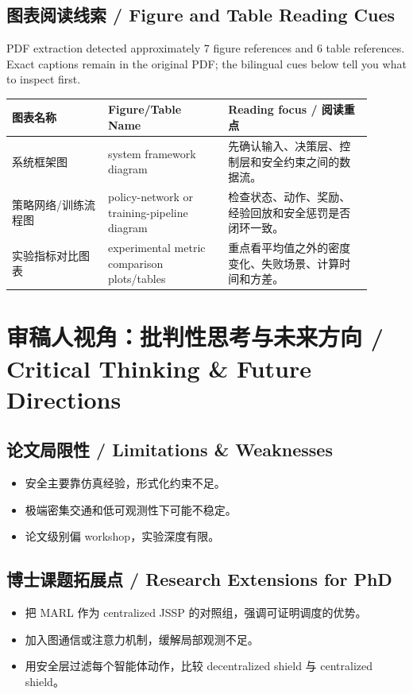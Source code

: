 \documentclass[UTF8,a4paper,11pt,fontset=fandol]{ctexart}
\begin{document}
\subsection{图表阅读线索 / Figure and Table Reading Cues}
PDF extraction detected approximately 7 figure references and 6 table references. Exact captions remain in the original PDF; the bilingual cues below tell you what to inspect first.

\begin{longtable}{p{0.24\linewidth}p{0.30\linewidth}p{0.36\linewidth}}
\toprule
图表名称 & Figure/Table Name & Reading focus / 阅读重点\\
\midrule
系统框架图 & system framework diagram & 先确认输入、决策层、控制层和安全约束之间的数据流。 \\
策略网络/训练流程图 & policy-network or training-pipeline diagram & 检查状态、动作、奖励、经验回放和安全惩罚是否闭环一致。 \\
实验指标对比图表 & experimental metric comparison plots/tables & 重点看平均值之外的密度变化、失败场景、计算时间和方差。 \\
\bottomrule
\end{longtable}

\section{审稿人视角：批判性思考与未来方向 / Critical Thinking \& Future Directions}
\subsection{论文局限性 / Limitations \& Weaknesses}
\begin{itemize}
\item 安全主要靠仿真经验，形式化约束不足。
\item 极端密集交通和低可观测性下可能不稳定。
\item 论文级别偏 workshop，实验深度有限。
\end{itemize}


\subsection{博士课题拓展点 / Research Extensions for PhD}
\begin{itemize}
\item 把 MARL 作为 centralized JSSP 的对照组，强调可证明调度的优势。
\item 加入图通信或注意力机制，缓解局部观测不足。
\item 用安全层过滤每个智能体动作，比较 decentralized shield 与 centralized shield。
\end{itemize}
\end{document}
